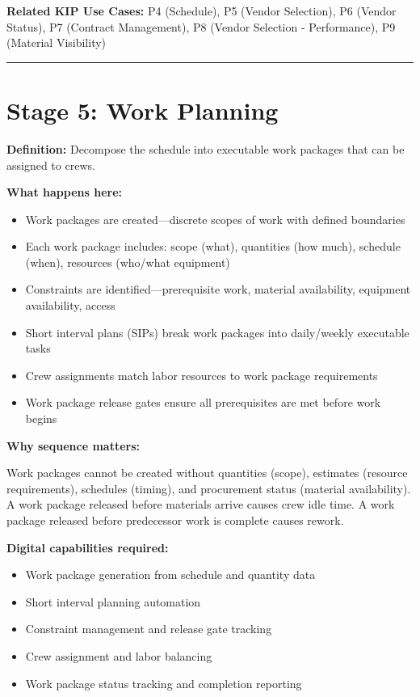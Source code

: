 \documentclass[11pt, letterpaper]{article}
\begin{document}
\textbf{Related KIP Use Cases:} P4 (Schedule), P5 (Vendor Selection), P6 (Vendor Status), P7 (Contract Management), P8 (Vendor Selection - Performance), P9 (Material Visibility)

\vspace{1em}

\hrule

\vspace{1em}

\section*{Stage 5: Work Planning}

\textbf{Definition:} Decompose the schedule into executable work packages that can be assigned to crews.

\textbf{What happens here:}
\begin{itemize}
    \item Work packages are created---discrete scopes of work with defined boundaries
    \item Each work package includes: scope (what), quantities (how much), schedule (when), resources (who/what equipment)
    \item Constraints are identified---prerequisite work, material availability, equipment availability, access
    \item Short interval plans (SIPs) break work packages into daily/weekly executable tasks
    \item Crew assignments match labor resources to work package requirements
    \item Work package release gates ensure all prerequisites are met before work begins
\end{itemize}

\textbf{Why sequence matters:}

Work packages cannot be created without quantities (scope), estimates (resource requirements), schedules (timing), and procurement status (material availability). A work package released before materials arrive causes crew idle time. A work package released before predecessor work is complete causes rework.

\textbf{Digital capabilities required:}
\begin{itemize}
    \item Work package generation from schedule and quantity data
    \item Short interval planning automation
    \item Constraint management and release gate tracking
    \item Crew assignment and labor balancing
    \item Work package status tracking and completion reporting
\end{itemize}
\end{document}
